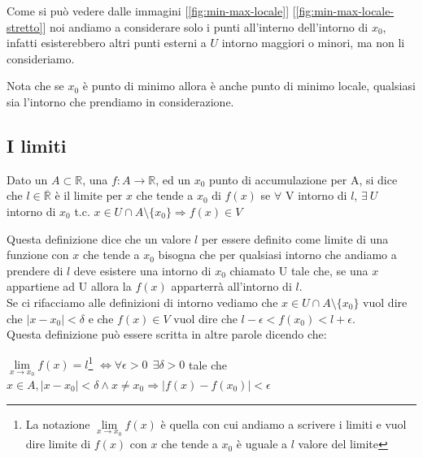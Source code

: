 Come si può vedere dalle immagini [\ref{fig:min-max-locale}] [\ref{fig:min-max-locale-stretto}] noi andiamo a considerare solo i punti all'interno dell'intorno di $x_0$, infatti esisterebbero altri punti esterni a $U$ intorno maggiori o minori, ma non li consideriamo.
\begin{note}
    Nota che se $x_0$ è punto di minimo allora è anche punto di minimo locale, qualsiasi sia l'intorno che prendiamo in considerazione.
\end{note}

\subsection{I limiti}
\begin{definition}[Limite]
    Dato un $A \subset \mathbb{R}$, una $f: A \longrightarrow \mathbb{R}$, ed un $x_0$ punto di accumulazione per A, si dice che $l \in \overline{\mathbb{R}}$ è il limite per $x$ che tende a $x_0$ di $f(x)$ se $\forall$ V intorno di $l$, $\exists \: U$ intorno di $x_0$ t.c. $x \in U \cap A \setminus \{x_0\} \Longrightarrow f(x) \in V$
\end{definition}
Questa definizione dice che un valore $l$ per essere definito come limite di una funzione con $x$ che tende a $x_0$ bisogna che per qualsiasi intorno che andiamo a prendere di $l$ deve esistere una intorno di $x_0$ chiamato U tale che, se una $x$ appartiene ad U allora la $f(x)$ apparterrà all'intorno di $l$. \\
Se ci rifacciamo alle definizioni di intorno vediamo che $x \in U \cap A \setminus \{x_0\}$ vuol dire che $|x-x_0| < \delta$ e che $f(x) \in V $ vuol dire che $l - \epsilon < f(x_0) < l + \epsilon$.\\
Questa definizione può essere scritta in altre parole dicendo che:
\begin{center}
    $\lim\limits_{x\to x_0}f(x) = l$\footnote{La notazione $\lim\limits_{x\to x_0}f(x)$ è quella con cui andiamo a scrivere i limiti e vuol dire limite di $f(x)$ con $x$ che tende a $x_0$ è uguale a $l$ valore del limite} $ \Longleftrightarrow \forall \epsilon > 0 \: \: \exists \delta > 0 $ tale che $x \in A, |x - x_0| < \delta \land x \neq x_0 \Longrightarrow |f(x) - f(x_0)| < \epsilon$
\end{center}
